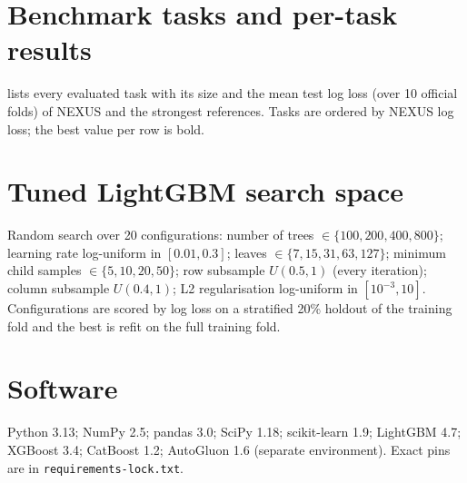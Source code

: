 \section{Benchmark tasks and per-task results}
\label{app:tasks}

 lists every evaluated task with its size and the mean test
log loss (over 10 official folds) of NEXUS and the strongest references. Tasks
are ordered by NEXUS log loss; the best value per row is bold.

{\scriptsize

\label{tab:pertask}
}

\section{Tuned LightGBM search space}
\label{app:tuning}
Random search over 20 configurations: number of trees $\in\{100,200,400,800\}$;
learning rate log-uniform in $[0.01, 0.3]$; leaves $\in\{7,15,31,63,127\}$; minimum
child samples $\in\{5,10,20,50\}$; row subsample $U(0.5,1)$ (every iteration);
column subsample $U(0.4,1)$; L2 regularisation log-uniform in $[10^{-3},10]$.
Configurations are scored by log loss on a stratified 20\% holdout of the
training fold and the best is refit on the full training fold.

\section{Software}
Python 3.13; NumPy 2.5; pandas 3.0; SciPy 1.18; scikit-learn 1.9; LightGBM 4.7;
XGBoost 3.4; CatBoost 1.2; AutoGluon 1.6 (separate environment). Exact pins are in
\texttt{requirements-lock.txt}.
